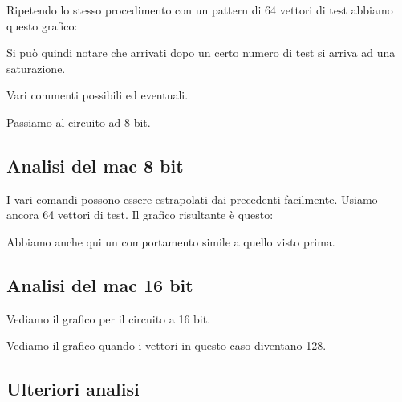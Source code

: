 \documentclass[12pt, letterpaper]{article}
\begin{document}
Ripetendo lo stesso procedimento con un pattern di 64 vettori di test abbiamo questo grafico:

\begin{figure}
\centering

\end{figure}

Si può quindi notare che arrivati dopo un certo numero di test si arriva ad una saturazione.

Vari commenti possibili ed eventuali.

Passiamo al circuito ad 8 bit.

\subsection{Analisi del mac 8 bit}
I vari comandi possono essere estrapolati dai precedenti facilmente.
Usiamo ancora 64 vettori di test.
Il grafico risultante è questo:

\begin{figure}
\centering

\end{figure}

Abbiamo anche qui un comportamento simile a quello visto prima.

\subsection{Analisi del mac 16 bit}
Vediamo il grafico per il circuito a 16 bit.
\begin{figure}
\centering

\end{figure}
Vediamo il grafico quando i vettori in questo caso diventano 128.
\begin{figure}
\centering

\end{figure}


\subsection{Ulteriori analisi}
\end{document}
